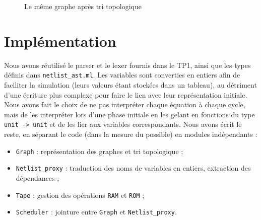 \documentclass[a4paper]{article}
\begin{document}
\begin{figure}[h]
    \centering
{}
\caption{Le même graphe après tri topologique}
\end{figure}


\section{Implémentation}

Nous avons réutilisé le parser et le lexer fournis dans le TP1, ainsi que les types définis dans \texttt{netlist\_ast.ml}.
Les variables sont converties en entiers afin de faciliter la simulation (leurs valeurs étant stockées dans un tableau), au détriment d'une écriture plus complexe pour faire le lien avec leur représentation initiale.
Nous avons fait le choix de ne pas interpréter chaque équation à chaque cycle, mais de les interpréter lors d'une phase initiale en les gelant en fonctions du type \texttt{unit -> unit} et de les lier aux variables correspondants.
Nous avons écrit le reste, en séparant le code (dans la mesure du possible) en modules indépendants :
\begin{itemize}
    \item \texttt{Graph} : représentation des graphes et tri topologique ;
    \item \texttt{Netlist\_proxy} : traduction des noms de variables en entiers, extraction des dépendances ;
    \item \texttt{Tape} : gestion des opérations \texttt{RAM} et \texttt{ROM} ;
    \item \texttt{Scheduler} : jointure entre \texttt{Graph} et \texttt{Netlist\_proxy}.
\end{itemize}
\end{document}
